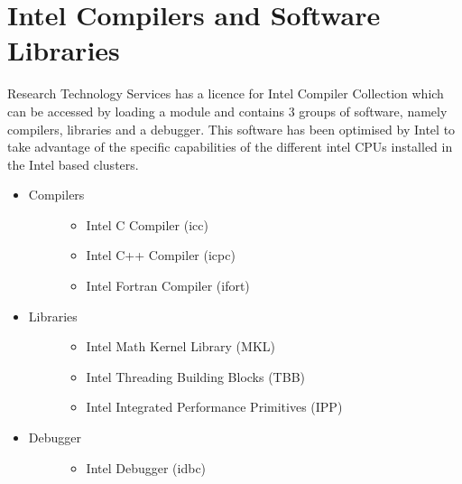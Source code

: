 \documentclass[letterpaper,10pt,english]{sphinxmanual}
\begin{document}
\section{Intel Compilers and Software Libraries}
\label{\detokenize{software/intel_compilers_and_libraries:intel-compilers-and-software-libraries}}\label{\detokenize{software/intel_compilers_and_libraries::doc}}
Research Technology Services has a licence for Intel Compiler Collection which can be accessed by loading a module and contains 3 groups of software, namely compilers, libraries and a debugger. This software has been optimised by Intel to take advantage of the specific capabilities of the different intel CPUs installed in the Intel based clusters.
\begin{itemize}
\item {} \begin{description}
\item[{Compilers}] \leavevmode\begin{itemize}
\item {} 
Intel C Compiler (icc)

\item {} 
Intel C++ Compiler (icpc)

\item {} 
Intel Fortran Compiler (ifort)

\end{itemize}

\end{description}

\item {} \begin{description}
\item[{Libraries}] \leavevmode\begin{itemize}
\item {} 
Intel Math Kernel Library (MKL)

\item {} 
Intel Threading Building Blocks (TBB)

\item {} 
Intel Integrated Performance Primitives (IPP)

\end{itemize}

\end{description}

\item {} \begin{description}
\item[{Debugger}] \leavevmode\begin{itemize}
\item {} 
Intel Debugger (idbc)

\end{itemize}

\end{description}

\end{itemize}
\end{document}
